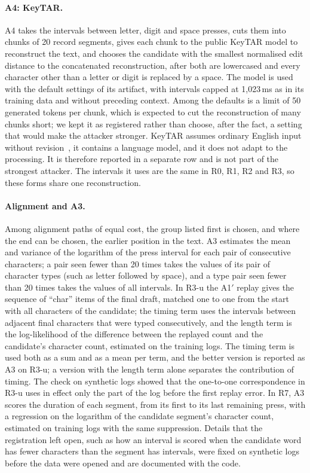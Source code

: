 \paragraph{A4: KeyTAR.}
A4 takes the intervals between letter, digit and space presses, cuts them into chunks of 20 record segments, gives
each chunk to the public KeyTAR model to reconstruct the text, and chooses the candidate with the smallest normalised
edit distance to the concatenated reconstruction, after both are lowercased and every character other than a letter or
digit is replaced by a space. The model is used with the default settings of its artifact, with intervals capped at
1,023\,ms as in its training data and without preceding context. Among the defaults is a limit of 50 generated tokens
per chunk, which is expected to cut the reconstruction of many chunks short; we kept it as registered rather than
choose, after the fact, a setting that would make the attacker stronger. KeyTAR assumes ordinary English input without
revision~\cite{qiu2026keytar}, it contains a language model, and it does not adapt to the processing. It is therefore
reported in a separate row and is not part of the strongest attacker. The intervals it uses are the same in R0, R1,
R2 and R3, so these forms share one reconstruction.

\paragraph{Alignment and A3.}
Among alignment paths of equal cost, the group listed first is chosen, and where the end can be chosen, the earlier
position in the text. A3 estimates the mean and variance of the logarithm of the press interval for each pair of
consecutive characters; a pair seen fewer than 20 times takes the values of its pair of character types (such as
letter followed by space), and a type pair seen fewer than 20 times takes the values of all intervals. In R3-u the
A1$'$ replay gives the sequence of ``char'' items of the final draft, matched one to one from the start with all
characters of the candidate; the timing term uses the intervals between adjacent final characters that were typed
consecutively, and the length term is the log-likelihood of the difference between the replayed count and the
candidate's character count, estimated on the training logs. The timing term is used both as a sum and as a mean per
term, and the better version is reported as A3 on R3-u; a version with the length term alone separates the
contribution of timing. The check on synthetic logs showed that the one-to-one correspondence in R3-u uses in effect
only the part of the log before the first replay error. In R7, A3 scores the duration of each segment, from its first
to its last remaining press, with a regression on the logarithm of the candidate segment's character count, estimated
on training logs with the same suppression. Details that the registration left open, such as how an interval is
scored when the candidate word has fewer characters than the segment has intervals, were fixed on synthetic logs
before the data were opened and are documented with the code.

